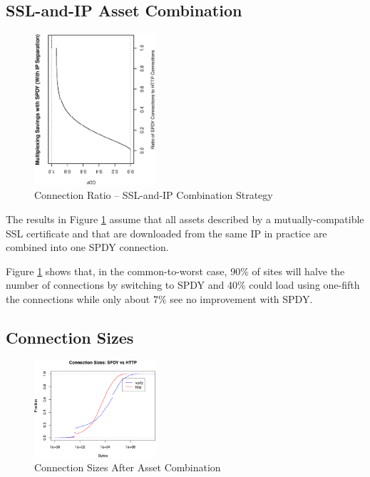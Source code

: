 \documentclass[10pt,letterpaper,notitlepage]{article}
\begin{document}
\subsection{SSL-and-IP Asset Combination}
\begin{figure}[h!]
\centering
\includegraphics[width=0.4\textwidth,angle=270]{plots/asset_combination_ssl_and_ip_ratio.eps}
\caption{Connection Ratio -- SSL-and-IP Combination Strategy}
\label{fig:combination-ssl-and-ip}
\end{figure}
The results in Figure \ref{fig:combination-ssl-and-ip} assume that all assets
described by a mutually-compatible SSL certificate and that are downloaded from
the same IP in practice are combined into one SPDY connection.

Figure \ref{fig:combination-ssl-and-ip} shows that, in the common-to-worst
case, 90\% of sites will halve the number of connections by switching to SPDY
and 40\% could load using one-fifth the connections while only about 7\% see no
improvement with SPDY.

\subsection{Connection Sizes}
\begin{figure}[h!]
\centering
\includegraphics[width=0.4\textwidth]{plots/asset_combination_connection_sizes.eps}
\caption{Connection Sizes After Asset Combination}
\label{fig:connection-sizes}
\end{figure}
\end{document}
